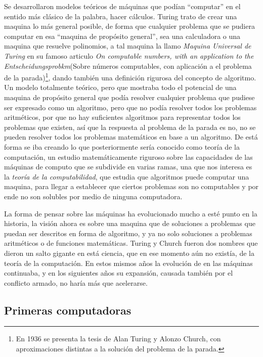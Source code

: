 \documentclass[letterpaper,12pt,oneside]{book}
\begin{document}
		Se desarrollaron modelos teóricos de máquinas que podían ``computar'' en el sentido más clásico de la palabra, hacer cálculos. Turing trato de crear
		una maquina lo más general posible, de forma que cualquier problema que se pudiera computar en esa ``maquina de propósito general'', sea una calculadora
		o una maquina que resuelve polinomios, a tal maquina la llamo \textit{Maquina Universal de Turing} en su famoso articulo
		\textit{On computable numbers, with an application to the
		Entscheidungsprobkm}(Sobre números computables, con aplicación a el problema de la parada)\footnote{En 1936 se presenta la tesis de Alan Turing y Alonzo Church, con
		aproximaciones distintas a la solución del problema de la parada.}, dando también una definición rigurosa del concepto
		de algoritmo. Un modelo
		totalmente teórico, pero que mostraba todo el potencial de una maquina de propósito general que podía resolver cualquier problema que pudiese ser expresado
		como un algoritmo, pero que no podía resolver todos los problemas aritméticos, por que no hay suficientes algoritmos para representar todos los
		problemas que existen, así que la respuesta al problema de la parada es no, no se pueden resolver todos los problemas matemáticos en base
		a un algoritmo. De está forma se iba creando lo que posteriormente sería conocido como teoría de la computación, un estudio matemáticamente riguroso
		sobre las capacidades de las máquinas de computo que se subdivide en varias ramas, una que nos interesa es la \textit{teoría de la computabilidad}, que estudia
		que algoritmos puede computar una maquina, para llegar a establecer que ciertos problemas son no computables y por ende no son solubles por medio de
		ninguna computadora\cite[p. 272]{ifrah_universal_2001}.
		
		La forma de pensar sobre las máquinas ha evolucionado mucho a esté punto en la historia, la visión ahora es sobre una maquina que de soluciones a problemas que
		puedan ser descritos en forma de algoritmo, y ya no solo soluciones a problemas aritméticos o de funciones matemáticas. Turing y Church
		fueron dos nombres que dieron un salto gigante en está ciencia, que en ese momento aún no existía, de la teoría de la computación. En estos mismos años la evolución
		de en las máquinas continuaba, y en los siguientes años su expansión, causada también por el conflicto armado, no haría más que acelerarse.
		
		\clearpage		
		
		\subsection{Primeras computadoras}
		
\end{document}
